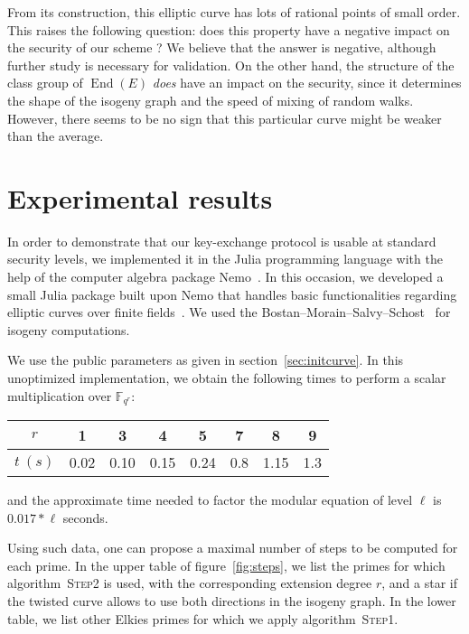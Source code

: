\documentclass{article}
\newcommand{\F}{\mathbb{F}}
\newcommand{\algstyle}[1]{\textsc{#1}}
\theoremstyle{definition}
\DeclareMathOperator{\End}{End}
\begin{document}
From its construction, this elliptic curve has lots of rational
points of small order. This raises the following question: does
this property have a negative impact on the security of our scheme ?
We believe that the answer is negative, although further study
is necessary for validation.
On the other hand, the structure of the class group of $\End(E)$
\emph{does} have an impact on the security, since it determines the
shape of the isogeny graph and the speed of mixing of random walks.
However, there seems to be no sign that this particular curve
might be weaker than the average.

\section{Experimental results}
\label{sec:exp}

In order to demonstrate that our key-exchange protocol is usable
at standard security levels, we implemented it in the Julia
programming language with the help of the computer algebra package
Nemo~\cite{todo:Nemo}. In this occasion, we developed a small
Julia package built upon Nemo that handles basic functionalities
regarding elliptic curves over finite fields~\cite{todo:package}.
We used the Bostan--Morain--Salvy--Schost~\cite{todo:BMSS} for
isogeny computations.

We use the public parameters as given in
section~\ref{sec:initcurve}.
In this unoptimized implementation, we obtain
the following times to perform a scalar multiplication over $\F_{q^r}$:

\begin{center}
\begin{tabular}{c|ccccccc}
$r$ & 1 & 3 & 4 & 5 & 7 & 8 & 9 \\
\hline
$t\ (s)$ & 0.02 & 0.10 & 0.15 & 0.24 & 0.8 & 1.15 & 1.3
\end{tabular}
\end{center}

and the approximate time needed to factor the modular equation of level $\ell$
is $0.017 * \ell$ seconds.

Using such data, one can propose a maximal number of steps to be
computed for each prime. In the upper table of figure~\ref{fig:steps}, we
list the primes for which algorithm~\algstyle{Step2} is used, with
the corresponding extension degree $r$, and a star if the twisted curve
allows to use both directions in the isogeny graph. In the lower table,
we list other Elkies primes for which we apply algorithm~\algstyle{Step1}.
\end{document}
